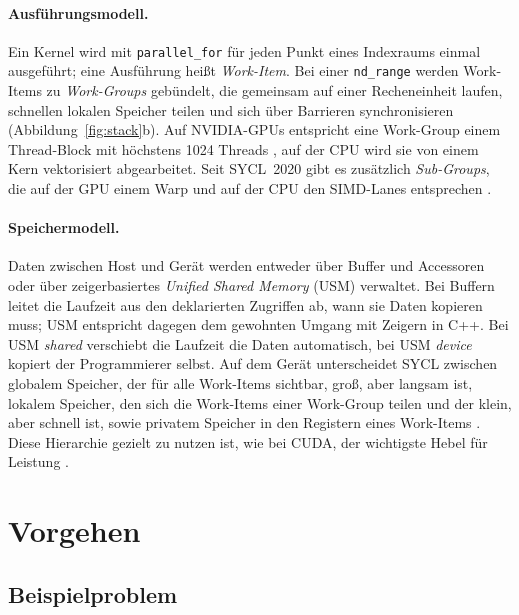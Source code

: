 \documentclass[12pt,a4paper]{article}
\begin{document}
\paragraph{Ausführungsmodell.}
Ein Kernel wird mit \texttt{parallel\_for} für jeden Punkt eines Indexraums
einmal ausgeführt; eine Ausführung heißt \emph{Work-Item}. Bei einer
\texttt{nd\_range} werden Work-Items zu \emph{Work-Groups} gebündelt, die
gemeinsam auf einer Recheneinheit laufen, schnellen lokalen Speicher teilen
und sich über Barrieren synchronisieren (Abbildung~\ref{fig:stack}b). Auf NVIDIA-GPUs entspricht eine
Work-Group einem Thread-Block mit höchstens 1024 Threads
\cite{nvidia_cuda_guide}, auf der CPU wird sie von einem Kern vektorisiert
abgearbeitet. Seit SYCL~2020 gibt es zusätzlich \emph{Sub-Groups}, die auf der
GPU einem Warp und auf der CPU den SIMD-Lanes entsprechen
\cite{khronos2020sycl}.

\paragraph{Speichermodell.}
Daten zwischen Host und Gerät werden entweder über Buffer und Accessoren oder
über zeigerbasiertes \emph{Unified Shared Memory} (USM) verwaltet. Bei Buffern
leitet die Laufzeit aus den deklarierten Zugriffen ab, wann sie Daten kopieren
muss; USM entspricht dagegen dem gewohnten Umgang mit Zeigern in C++. Bei USM
\emph{shared} verschiebt die Laufzeit die Daten automatisch, bei USM
\emph{device} kopiert der Programmierer selbst. Auf dem Gerät unterscheidet
SYCL zwischen globalem Speicher, der für alle Work-Items sichtbar, groß, aber
langsam ist, lokalem Speicher, den sich die Work-Items einer Work-Group teilen
und der klein, aber schnell ist, sowie privatem Speicher in den Registern
eines Work-Items \cite{reinders2023dpcpp}. Diese Hierarchie gezielt zu
nutzen ist, wie bei CUDA, der wichtigste Hebel für Leistung
\cite{hwu2022pmpp}.

\section{Vorgehen}\label{sec:vorgehen}

\subsection{Beispielproblem}
\end{document}
